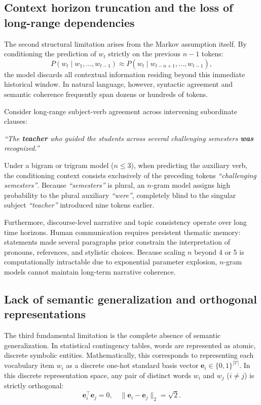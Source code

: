 \documentclass[../../main.tex]{subfiles}
\begin{document}
\subsection{Context horizon truncation and the loss of long-range dependencies}
\label{subsec:context_truncation}

The second structural limitation arises from the Markov assumption itself. By conditioning the prediction of $w_t$ strictly on the previous $n-1$ tokens:
\begin{equation}
P(w_t \mid w_1, \dots, w_{t-1}) \approx P(w_t \mid w_{t-n+1}, \dots, w_{t-1}),
\end{equation}
the model discards all contextual information residing beyond this immediate historical window. In natural language, however, syntactic agreement and semantic coherence frequently span dozens or hundreds of tokens. 

Consider long-range subject-verb agreement across intervening subordinate clauses:
\begin{center}
\textit{``The \textbf{teacher} who guided the students across several challenging semesters \textbf{was} recognized.''}
\end{center}
Under a bigram or trigram model ($n \le 3$), when predicting the auxiliary verb, the conditioning context consists exclusively of the preceding tokens \textit{``challenging semesters''}. Because \textit{``semesters''} is plural, an $n$-gram model assigns high probability to the plural auxiliary \textit{``were''}, completely blind to the singular subject \textit{``teacher''} introduced nine tokens earlier.

Furthermore, discourse-level narrative and topic consistency operate over long time horizons. Human communication requires persistent thematic memory: statements made several paragraphs prior constrain the interpretation of pronouns, references, and stylistic choices. Because scaling $n$ beyond 4 or 5 is computationally intractable due to exponential parameter explosion, $n$-gram models cannot maintain long-term narrative coherence.

\subsection{Lack of semantic generalization and orthogonal representations}
\label{subsec:lack_of_semantics}

The third fundamental limitation is the complete absence of semantic generalization. In statistical contingency tables, words are represented as atomic, discrete symbolic entities. Mathematically, this corresponds to representing each vocabulary item $w_i$ as a discrete one-hot standard basis vector $\mathbf{e}_i \in \{0, 1\}^{|\mathcal{V}|}$. In this discrete representation space, any pair of distinct words $w_i$ and $w_j$ ($i \neq j$) is strictly orthogonal:
\begin{equation}
\mathbf{e}_i^\top \mathbf{e}_j = 0, \quad \|\mathbf{e}_i - \mathbf{e}_j\|_2 = \sqrt{2}.
\end{equation}
\end{document}
